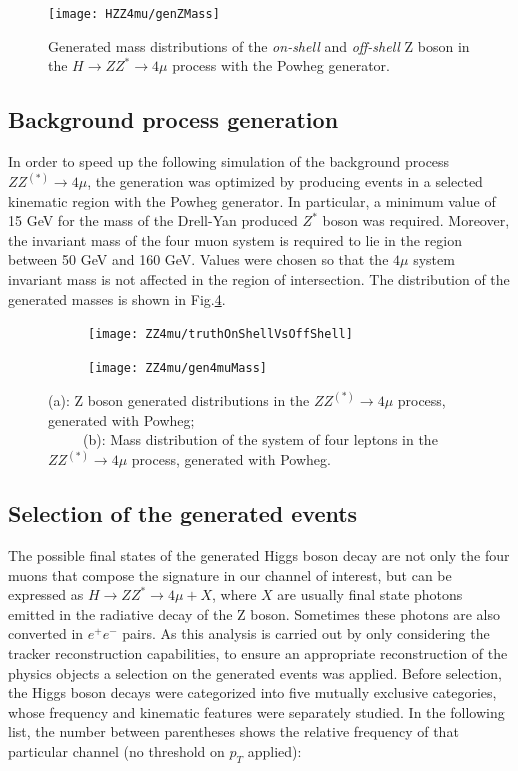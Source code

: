 \documentclass[a4paper,twoside,12pt]{book}
\begin{document}
\begin{figure}
\centering
  \texttt{[image: HZZ4mu/genZMass]}
  \caption{Generated mass distributions of the \textit{on-shell} and \textit{off-shell} Z boson 
  in the $H \rightarrow ZZ^{*} \rightarrow 4\mu$ process with the Powheg generator.}
\label{fig:HZZ4mu:generatedZMass}
\end{figure}

\subsection{Background process generation}\label{physics:bkgGeneration}
In order to speed up the following simulation of the background process $ZZ^{(*)} \rightarrow 4\mu$, the generation was optimized by
producing events in a selected kinematic region with the Powheg generator\cite{Powheg}. In particular, a minimum value of 15 GeV for the mass of
the Drell-Yan produced $Z^*$ boson was required. Moreover, the invariant mass of the four muon system is required 
to lie in the region between 50 GeV and 160 GeV. Values were chosen so that the $4\mu$ system invariant mass is not affected in the region of intersection. The distribution of the generated masses is shown 
in Fig.\ref{fig:ZZ4mu:genMasses}.\\

\begin{figure}
\begin{subfigure}{.5\linewidth}
\texttt{[image: ZZ4mu/truthOnShellVsOffShell]}
\caption{}
\label{fig:ZZ4mu:truthOnShellVsOffShell}
\end{subfigure}
\begin{subfigure}{.5\linewidth}
\centering
\texttt{[image: ZZ4mu/gen4muMass]}
\caption{}
\label{fig:ZZ4mu:gen4muMass}
\end{subfigure}
\caption{(a): Z boson generated distributions in the $ZZ^{(*)} \rightarrow 4\mu$ process, generated with Powheg;\\
\ \ \ \ \ (b): Mass distribution of the system of four leptons in the $ZZ^{(*)} \rightarrow 4\mu$ process, generated with Powheg.}
\label{fig:ZZ4mu:genMasses}
\end{figure}


\subsection{Selection of the generated events}
The possible final states of the generated Higgs boson decay are not only the four muons that 
compose the signature in our channel of interest, but can be expressed as $H \rightarrow
ZZ^* \rightarrow 4\mu + X$, where $X$ are usually final state photons emitted in the
radiative decay of the Z boson. Sometimes these photons are also converted in $e^{+}e^{-}$ pairs.
 As this analysis is carried out by only considering the tracker reconstruction capabilities, to ensure 
an appropriate reconstruction of the physics objects a selection on the 
generated events was applied. Before selection, the Higgs boson decays were categorized into five 
mutually exclusive categories, whose frequency and kinematic features were separately 
studied. In the following list, the number between parentheses shows the relative frequency
of that particular channel (no threshold on $p_{T}$ applied):
\end{document}
